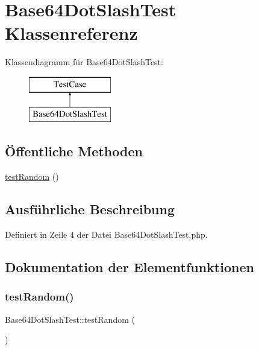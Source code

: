 \hypertarget{class_base64_dot_slash_test}{}\section{Base64\+Dot\+Slash\+Test Klassenreferenz}
\label{class_base64_dot_slash_test}
Klassendiagramm für Base64\+Dot\+Slash\+Test\+:\begin{figure}[H]
\begin{center}
\leavevmode
\includegraphics[height=2.000000cm]{class_base64_dot_slash_test}
\end{center}
\end{figure}
\subsection*{Öffentliche Methoden}
\begin{DoxyCompactItemize}
\item 
\mbox{\hyperlink{class_base64_dot_slash_test_a666b71ef786a07e44810a8ba95303c9e}{test\+Random}} ()
\end{DoxyCompactItemize}


\subsection{Ausführliche Beschreibung}


Definiert in Zeile 4 der Datei Base64\+Dot\+Slash\+Test.\+php.



\subsection{Dokumentation der Elementfunktionen}
\mbox{\label{class_base64_dot_slash_test_a666b71ef786a07e44810a8ba95303c9e}} 
\subsubsection{\texorpdfstring{test\+Random()}{testRandom()}}
{\footnotesize\ttfamily Base64\+Dot\+Slash\+Test\+::test\+Random (\begin{DoxyParamCaption}{ }\end{DoxyParamCaption})}

